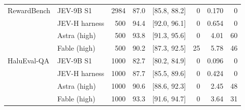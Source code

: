 \begin{table}[t]
\begin{tabular}{@{}llrrcrrr@{}}
\addlinespace
RewardBench & JEV-9B S1 & 2984 & 87.0 & [85.8, 88.2] & 0 & 0.170 & 0 \\
 & JEV-H harness & 500 & 94.4 & [92.0, 96.1] & 0 & 0.654 & 0 \\
 & Astra (high) & 500 & 93.8 & [91.3, 95.6] & 0 & 4.01 & 60 \\
 & Fable (high) & 500 & 90.2 & [87.3, 92.5] & 25 & 5.78 & 46 \\
\addlinespace
HaluEval-QA & JEV-9B S1 & 1000 & 82.7 & [80.2, 84.9] & 0 & 0.096 & 0 \\
 & JEV-H harness & 1000 & 87.7 & [85.5, 89.6] & 0 & 0.424 & 0 \\
 & Astra (high) & 1000 & 90.6 & [88.6, 92.3] & 0 & 2.45 & 48 \\
 & Fable (high) & 1000 & 93.3 & [91.6, 94.7] & 0 & 3.64 & 31 \\
\bottomrule
\end{tabular}
\end{table}
